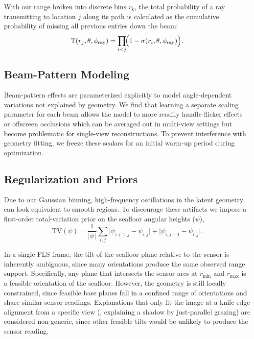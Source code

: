 With our range broken into discrete bins \(r_k\), the total probability of a ray transmitting to location \(j\) along its path is calculated as the cumulative probability of missing all previous entries down the beam:
\begin{equation}
    \operatorname{T}(r_j, \theta, \phi_\text{ray}) = \prod_{i<j}\!\Bigl(1-\sigma(r_i,\theta,\phi_\text{ray})\Bigr).
\end{equation}


\subsection{Beam-Pattern Modeling}
\label{sec:beam_pattern}
Beam-pattern effects are parameterized explicitly to model angle-dependent variations not explained by geometry. We find that learning a separate scaling parameter for each beam allows the model to more readily handle flicker effects or offscreen occlusions which can be averaged out in multi-view settings but become problematic for single-view reconstructions. To prevent interference with geometry fitting, we freeze these scalars for an initial warm-up period during optimization.


\subsection{Regularization and Priors}
Due to our Gaussian binning, high-frequency oscillations in the latent geometry can look equivalent to smooth regions. To discourage these artifacts we impose a first-order total-variation prior on the seafloor angular heights (\(\psi\)),
\begin{equation}
\mathrm{TV}(\psi)=\frac{1}{\lvert \psi\rvert}\sum_{i,j}\bigl\lvert \psi_{i+1,j}-\psi_{i,j}\bigr\rvert+\bigl\lvert \psi_{i,j+1}-\psi_{i,j}\bigr\rvert.
\end{equation}

In a single FLS frame, the tilt of the seafloor plane relative to the sensor is inherently ambiguous, since many orientations produce the same observed range support. Specifically, any plane that intersects the sensor arcs at \(r_{\min}\) and \(r_{\max}\) is a feasible orientation of the seafloor. However, the geometry is still locally constrained, since feasible base planes fall in a confined range of orientations and share similar sensor readings. Explanations that only fit the image at a knife-edge alignment from a specific view (\eg, explaining a shadow by just-parallel grazing) are considered non-generic, since other feasible tilts would be unlikely to produce the sensor reading.

